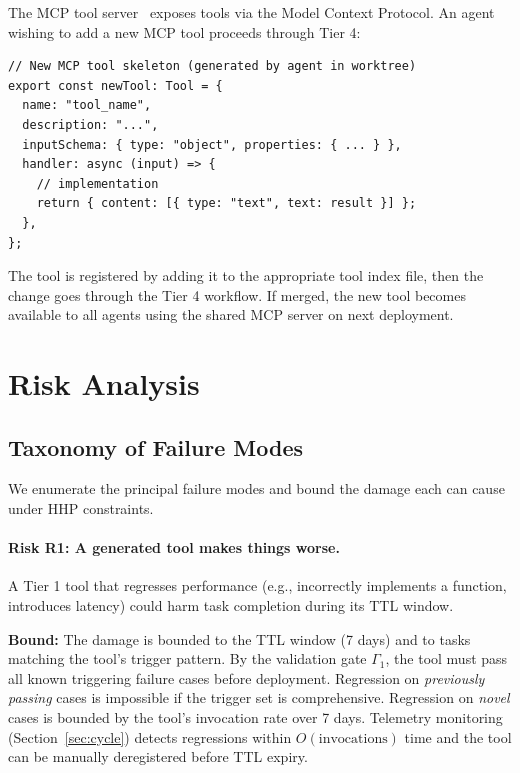 \documentclass[11pt]{article}
\begin{document}
The MCP tool server~\cite{anthropic2024mcp} exposes tools via the Model Context
Protocol. An agent wishing to add a new MCP tool proceeds through Tier 4:

\begin{verbatim}
// New MCP tool skeleton (generated by agent in worktree)
export const newTool: Tool = {
  name: "tool_name",
  description: "...",
  inputSchema: { type: "object", properties: { ... } },
  handler: async (input) => {
    // implementation
    return { content: [{ type: "text", text: result }] };
  },
};
\end{verbatim}

The tool is registered by adding it to the appropriate tool index file, then
the change goes through the Tier 4 workflow. If merged, the new tool becomes
available to all agents using the shared MCP server on next deployment.

\section{Risk Analysis}
\label{sec:risks}

\subsection{Taxonomy of Failure Modes}
\label{sec:failmodes}

We enumerate the principal failure modes and bound the damage each can cause
under HHP constraints.

\paragraph{Risk R1: A generated tool makes things worse.}
A Tier 1 tool that regresses performance (e.g., incorrectly implements a
function, introduces latency) could harm task completion during its TTL window.

\textbf{Bound:} The damage is bounded to the TTL window (7 days) and to tasks
matching the tool's trigger pattern. By the validation gate $\Gamma_1$, the
tool must pass all known triggering failure cases before deployment. Regression
on \emph{previously passing} cases is impossible if the trigger set is
comprehensive. Regression on \emph{novel} cases is bounded by the tool's
invocation rate over 7 days. Telemetry monitoring (Section~\ref{sec:cycle})
detects regressions within $O(\text{invocations})$ time and the tool can be
manually deregistered before TTL expiry.
\end{document}
